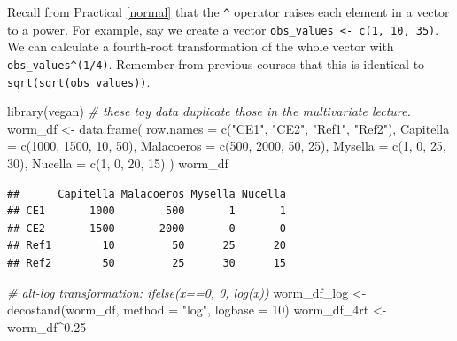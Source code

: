 \documentclass[
  11pt,
  a4paper,
]{book}
\newenvironment{Shaded}{\begin{snugshade}}{\end{snugshade}}
\newcommand{\AttributeTok}[1]{\textcolor[rgb]{0.77,0.63,0.00}{#1}}
\newcommand{\CommentTok}[1]{\textcolor[rgb]{0.56,0.35,0.01}{\textit{#1}}}
\newcommand{\DecValTok}[1]{\textcolor[rgb]{0.00,0.00,0.81}{#1}}
\newcommand{\FloatTok}[1]{\textcolor[rgb]{0.00,0.00,0.81}{#1}}
\newcommand{\FunctionTok}[1]{\textcolor[rgb]{0.00,0.00,0.00}{#1}}
\newcommand{\NormalTok}[1]{#1}
\newcommand{\OtherTok}[1]{\textcolor[rgb]{0.56,0.35,0.01}{#1}}
\newcommand{\SpecialCharTok}[1]{\textcolor[rgb]{0.00,0.00,0.00}{#1}}
\newcommand{\StringTok}[1]{\textcolor[rgb]{0.31,0.60,0.02}{#1}}
\begin{document}
Recall from Practical \ref{normal} that the \texttt{\^{}} operator raises each element in a vector to a power. For example, say we create a vector \texttt{obs\_values\ \textless{}-\ c(1,\ 10,\ 35)}. We can calculate a fourth-root transformation of the whole vector with \texttt{obs\_values\^{}(1/4)}. Remember from previous courses that this is identical to \texttt{sqrt(sqrt(obs\_values))}.

\begin{Shaded}
\begin{Highlighting}[]
\FunctionTok{library}\NormalTok{(vegan) }
\CommentTok{\# these toy data duplicate those in the multivariate lecture.}
\NormalTok{worm\_df }\OtherTok{\textless{}{-}} \FunctionTok{data.frame}\NormalTok{(}
  \AttributeTok{row.names =} \FunctionTok{c}\NormalTok{(}\StringTok{"CE1"}\NormalTok{, }\StringTok{"CE2"}\NormalTok{, }\StringTok{"Ref1"}\NormalTok{, }\StringTok{"Ref2"}\NormalTok{),}
  \AttributeTok{Capitella =} \FunctionTok{c}\NormalTok{(}\DecValTok{1000}\NormalTok{, }\DecValTok{1500}\NormalTok{, }\DecValTok{10}\NormalTok{, }\DecValTok{50}\NormalTok{),}
  \AttributeTok{Malacoeros =} \FunctionTok{c}\NormalTok{(}\DecValTok{500}\NormalTok{, }\DecValTok{2000}\NormalTok{, }\DecValTok{50}\NormalTok{, }\DecValTok{25}\NormalTok{),}
  \AttributeTok{Mysella =} \FunctionTok{c}\NormalTok{(}\DecValTok{1}\NormalTok{, }\DecValTok{0}\NormalTok{, }\DecValTok{25}\NormalTok{, }\DecValTok{30}\NormalTok{),}
  \AttributeTok{Nucella =} \FunctionTok{c}\NormalTok{(}\DecValTok{1}\NormalTok{, }\DecValTok{0}\NormalTok{, }\DecValTok{20}\NormalTok{, }\DecValTok{15}\NormalTok{)}
\NormalTok{)}
\NormalTok{worm\_df}
\end{Highlighting}
\end{Shaded}

\begin{verbatim}
##      Capitella Malacoeros Mysella Nucella
## CE1       1000        500       1       1
## CE2       1500       2000       0       0
## Ref1        10         50      25      20
## Ref2        50         25      30      15
\end{verbatim}

\begin{Shaded}
\begin{Highlighting}[]
\CommentTok{\# alt{-}log transformation: ifelse(x==0, 0, log(x))}
\NormalTok{worm\_df\_log }\OtherTok{\textless{}{-}} \FunctionTok{decostand}\NormalTok{(worm\_df, }\AttributeTok{method =} \StringTok{"log"}\NormalTok{, }\AttributeTok{logbase =} \DecValTok{10}\NormalTok{)}
\NormalTok{worm\_df\_4rt }\OtherTok{\textless{}{-}}\NormalTok{ worm\_df}\SpecialCharTok{\^{}}\FloatTok{0.25}
\end{Highlighting}
\end{Shaded}
\end{document}

